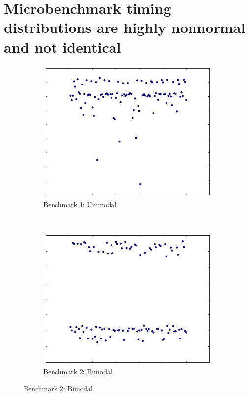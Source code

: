 \documentclass[conference]{IEEEtran}
\begin{document}

\label{sec:experiment}
\section{Microbenchmark timing distributions are highly nonnormal and not identical}

\begin{figure}
\centering

\begin{subfigure}{0.22\textwidth}
    \centering
    \includegraphics[width=\textwidth]{figures/fig1/simple_branchsum_fast}
    \caption{Benchmark 1: Unimodal}
\end{subfigure}%
~
\begin{subfigure}{0.22\textwidth}
    \centering
    \includegraphics[width=\textwidth]{figures/fig1/bimodal_branchsum}
    \caption{Benchmark 2: Bimodal}
\end{subfigure}


\end{figure}
\end{document}
